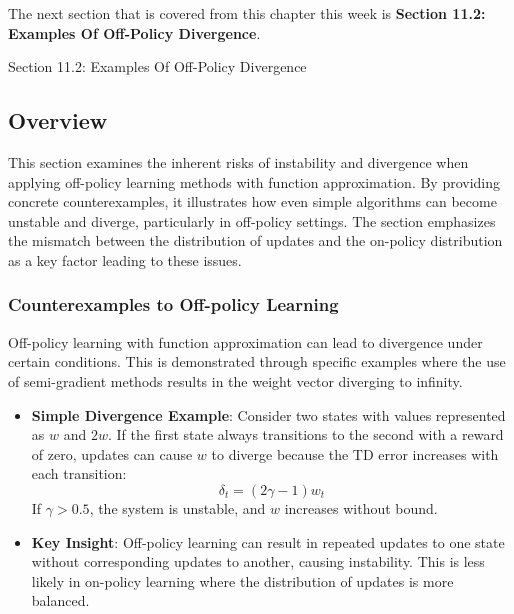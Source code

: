 The next section that is covered from this chapter this week is \textbf{Section 11.2: Examples Of Off-Policy Divergence}.

\begin{notes}{Section 11.2: Examples Of Off-Policy Divergence}
    \subsection*{Overview}

    This section examines the inherent risks of instability and divergence when applying off-policy learning methods with function approximation. By providing concrete counterexamples, it illustrates how 
    even simple algorithms can become unstable and diverge, particularly in off-policy settings. The section emphasizes the mismatch between the distribution of updates and the on-policy distribution as a 
    key factor leading to these issues.
    
    \subsubsection*{Counterexamples to Off-policy Learning}
    
    Off-policy learning with function approximation can lead to divergence under certain conditions. This is demonstrated through specific examples where the use of semi-gradient methods results in the 
    weight vector diverging to infinity.
    
    \begin{highlight}
    
        \begin{itemize}
            \item \textbf{Simple Divergence Example}: Consider two states with values represented as $w$ and $2w$. If the first state always transitions to the second with a reward of zero, updates 
            can cause $w$ to diverge because the TD error increases with each transition:
            \[
            \delta_t = (2\gamma - 1)w_t
            \]
            If $\gamma > 0.5$, the system is unstable, and $w$ increases without bound.
            \item \textbf{Key Insight}: Off-policy learning can result in repeated updates to one state without corresponding updates to another, causing instability. This is less likely in on-policy 
            learning where the distribution of updates is more balanced.
        \end{itemize}
    

\end{highlight}
\end{notes}
